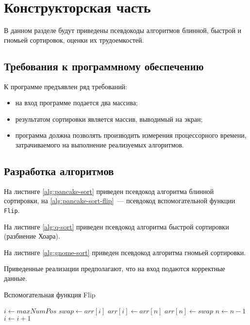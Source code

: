 \chapter{Конструкторская часть}

В данном разделе будут приведены псевдокоды алгоритмов блинной, быстрой и гномьей сортировок, оценки их трудоемкостей.

\section{Требования к программному обеспечению}

К программе предъявлен ряд требований:
\begin{itemize}
    \item на вход программе подается два массива;
    \item результатом сортировки является массив, выводимый на экран;
    \item программа должна позволять производить измерения процессорного времени, затрачиваемого на выполнение реализуемых алгоритмов.
\end{itemize}

\section{Разработка алгоритмов}

На листинге \ref{alg:pancake-sort} приведен псевдокод алгоритма блинной сортировки, на \ref{alg:pancake-sort-flip}~--- псевдокод вспомогательной функции \texttt{Flip}.

На листинге \ref{alg:q-sort} приведен псевдокод алгоритма быстрой сортировки (разбиение Хоара).

На листинге \ref{alg:gnome-sort} приведен псевдокод алгоритма гномьей сортировки.

Приведенные реализации предполагают, что на вход подаются корректные данные.

\begin{algorithm}[H]
    \caption{Вспомогательная функция Flip}
    \label{alg:pancake-sort-flip}
    \begin{algorithmic}[1]
        \State $i\gets maxNumPos$
        \State $swap\gets arr[i]$
        \State $arr[i]\gets arr[n]$
        \State $arr[n]\gets swap$
        \State $n\gets n - 1$
        \State $i\gets i + 1$
        \EndWhile
        \EndProcedure
    \end{algorithmic}
\end{algorithm}

